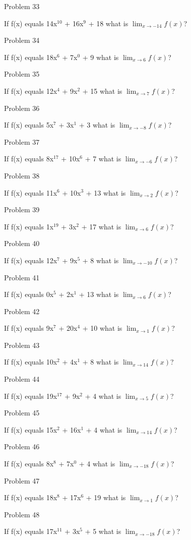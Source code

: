 \documentclass{article}
\begin{document}
Problem 33

If f(x) equals 14x$^{10}$ + 16x$^{9}$ + 18 what is $\lim_{x\to -14} f(x) $?

Problem 34

If f(x) equals 18x$^{6}$ + 7x$^{0}$ + 9 what is $\lim_{x\to 6} f(x) $?

Problem 35

If f(x) equals 12x$^{4}$ + 9x$^{2}$ + 15 what is $\lim_{x\to 7} f(x) $?

Problem 36

If f(x) equals 5x$^{7}$ + 3x$^{1}$ + 3 what is $\lim_{x\to -8} f(x) $?

Problem 37

If f(x) equals 8x$^{17}$ + 10x$^{6}$ + 7 what is $\lim_{x\to -6} f(x) $?

Problem 38

If f(x) equals 11x$^{6}$ + 10x$^{3}$ + 13 what is $\lim_{x\to 2} f(x) $?

Problem 39

If f(x) equals 1x$^{19}$ + 3x$^{2}$ + 17 what is $\lim_{x\to 6} f(x) $?

Problem 40

If f(x) equals 12x$^{7}$ + 9x$^{5}$ + 8 what is $\lim_{x\to -10} f(x) $?

Problem 41

If f(x) equals 0x$^{5}$ + 2x$^{1}$ + 13 what is $\lim_{x\to 6} f(x) $?

Problem 42

If f(x) equals 9x$^{7}$ + 20x$^{4}$ + 10 what is $\lim_{x\to 1} f(x) $?

Problem 43

If f(x) equals 10x$^{2}$ + 4x$^{1}$ + 8 what is $\lim_{x\to 14} f(x) $?

Problem 44

If f(x) equals 19x$^{17}$ + 9x$^{2}$ + 4 what is $\lim_{x\to 5} f(x) $?

Problem 45

If f(x) equals 15x$^{2}$ + 16x$^{1}$ + 4 what is $\lim_{x\to 14} f(x) $?

Problem 46

If f(x) equals 8x$^{8}$ + 7x$^{0}$ + 4 what is $\lim_{x\to -18} f(x) $?

Problem 47

If f(x) equals 18x$^{8}$ + 17x$^{6}$ + 19 what is $\lim_{x\to 1} f(x) $?

Problem 48

If f(x) equals 17x$^{11}$ + 3x$^{5}$ + 5 what is $\lim_{x\to -18} f(x) $?
\end{document}
